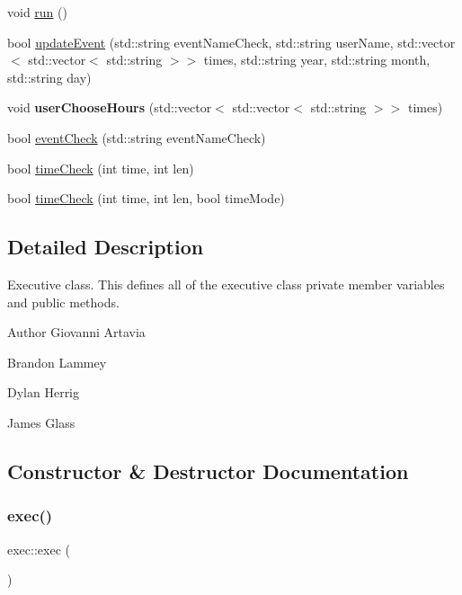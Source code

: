 \begin{DoxyCompactItemize}
void \hyperlink{classexec_aad3ea9a2cd99fc28471062719b85b1f6}{run} ()
\item 
bool \hyperlink{classexec_a53711d45518e4b3b690db15f057c1452}{update\+Event} (std\+::string event\+Name\+Check, std\+::string user\+Name, std\+::vector$<$ std\+::vector$<$ std\+::string $>$$>$ times, std\+::string year, std\+::string month, std\+::string day)
\item 
\mbox{\label{classexec_a24fd11e0df1de9dee4fcc41623815aea}} 
void {\bfseries user\+Choose\+Hours} (std\+::vector$<$ std\+::vector$<$ std\+::string $>$$>$ times)
\item 
bool \hyperlink{classexec_abf1c735a300deae3f5de4bf6891f2190}{event\+Check} (std\+::string event\+Name\+Check)
\item 
bool \hyperlink{classexec_a7e711b54128bd8ff8039886ce4ce6fb3}{time\+Check} (int time, int len)
\item 
bool \hyperlink{classexec_afc82b1343e127d9a7bdc36f050bdf605}{time\+Check} (int time, int len, bool time\+Mode)
\end{DoxyCompactItemize}


\subsection{Detailed Description}
Executive class. This defines all of the executive class\textquotesingle{} private member variables and public methods. \begin{DoxyAuthor}{Author}
Giovanni Artavia 

Brandon Lammey 

Dylan Herrig 

James Glass 
\end{DoxyAuthor}


\subsection{Constructor \& Destructor Documentation}
\mbox{\label{classexec_a2fac94db8f997a01a590c01478662339}} 
\subsubsection{\texorpdfstring{exec()}{exec()}}
{\footnotesize\ttfamily exec\+::exec (\begin{DoxyParamCaption}{ }\end{DoxyParamCaption})}

